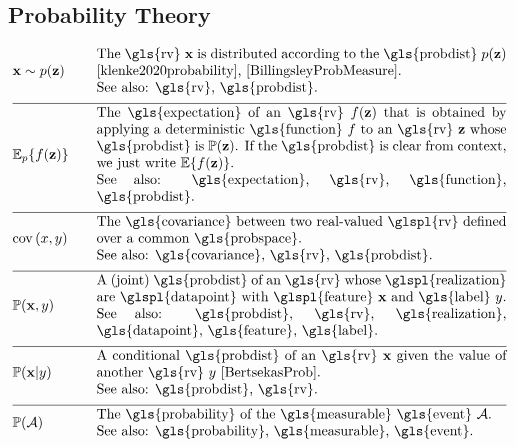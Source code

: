 \subsection*{Probability Theory} 
\begin{align}
	&\featurevec \sim p(\vz)  &\quad & \parbox{.85\textwidth}{The \gls{rv} $\featurevec$ is distributed according to 
		the \gls{probdist} $p(\vz)$ \cite{klenke2020probability}, \cite{BillingsleyProbMeasure}.
		\\ See also: \gls{rv}, \gls{probdist}.}  \nonumber \\[2mm] \hline \nonumber\\[-5mm]  
	&\expect_{p} \{ f(\datapoint) \}  &\quad & \parbox{.85\textwidth}{The \gls{expectation} of an \gls{rv} $f(\datapoint)$ that 
		is obtained by applying a deterministic \gls{function} $f$ to an \gls{rv}
		$\datapoint$ whose \gls{probdist} is $\prob{\datapoint}$. If the \gls{probdist} is clear from context, 
		we just write $\expect \{ f(\datapoint) \}$. 
		\\ See also: \gls{expectation}, \gls{rv}, \gls{function}, \gls{probdist}.}  \nonumber \\[2mm] \hline \nonumber\\[-5mm]
	&\cov{x}{y} &\quad & \parbox{.85\textwidth}{The \gls{covariance} between two real-valued \glspl{rv} defined 
		over a common \gls{probspace}. 
		\\ See also: \gls{covariance}, \gls{rv}, \gls{probdist}.}  \nonumber \\[2mm] \hline \nonumber\\[-5mm]
	&\prob{\featurevec,\truelabel} &\quad & \parbox{.85\textwidth}{A (joint) \gls{probdist} of an \gls{rv} 
		whose \glspl{realization} are \glspl{datapoint} with \glspl{feature} $\featurevec$ and \gls{label} $\truelabel$.
		\\ See also: \gls{probdist}, \gls{rv}, \gls{realization}, \gls{datapoint}, \gls{feature}, 
		\gls{label}.} \nonumber \\[2mm] \hline \nonumber\\[-5mm]
	&\prob{\featurevec|\truelabel} &\quad & \parbox{.85\textwidth}{A conditional \gls{probdist} of an \gls{rv} 
		$\featurevec$ given the value of another \gls{rv} $\truelabel$ \cite[Sec.\ 3.5]{BertsekasProb}. 
		\\ See also: \gls{probdist}, \gls{rv}. } \nonumber \\[2mm] \hline \nonumber\\[-5mm]
	&\prob{\mathcal{A}} &\quad & \parbox{.85\textwidth}{The \gls{probability} of the \gls{measurable} \gls{event} $\mathcal{A}$. 
		\\ See also: \gls{probability}, \gls{measurable}, \gls{event}.} \nonumber 
\end{align} 
